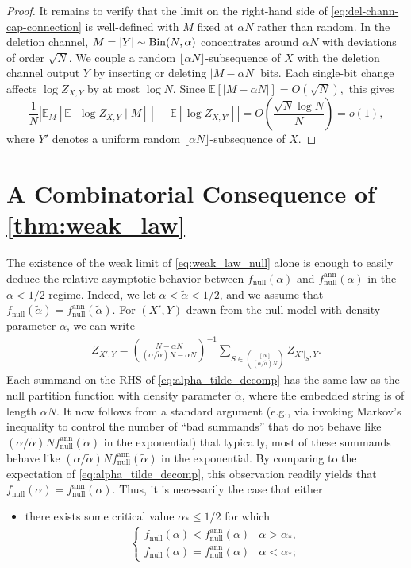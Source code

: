 \documentclass[11pt]{amsart}
\numberwithin{equation}{section}
\numberwithin{equation}{section}
\newcommand{\1}{\mathbbm{1}}
\newcommand{\E}{\mathbb{E}}
\newcommand{\Bin}{\textup{Bin}}
\newcommand{\fnull}{f_{\mathrm{null}}}
\newcommand{\fnullann}{f_{\mathrm{null}}^{\mathrm{ann}}}
\theoremstyle{definition}
\begin{document}
\begin{appendices}
\begin{proof}
It remains to verify that the limit on the right-hand side of \eqref{eq:del-chann-cap-connection} is well-defined with $M$ fixed at $\alpha N$ rather than random. In the deletion channel, $M = |Y| \sim \Bin(N,\alpha)$ concentrates around $\alpha N$ with deviations of order $\sqrt{N}.$ We couple a random $\lfloor\alpha N\rfloor$-subsequence of $X$ with the deletion channel output $Y$ by inserting or deleting $|M - \alpha N|$ bits. Each single-bit change affects $\log Z_{X,Y}$ by at most $\log N$. Since $\E[|M - \alpha N|] = O(\sqrt{N}),$ this gives
\[
\frac{1}{N}\left|\E_M\left[\E[\log Z_{X,Y} \mid M]\right] - \E[\log Z_{X, Y'}]\right| = O\!\left(\frac{\sqrt{N}\log N}{N}\right) = o(1),
\]
where $Y'$ denotes a uniform random $\lfloor\alpha N\rfloor$-subsequence of $X.$
\end{proof}

\section{\texorpdfstring{A Combinatorial Consequence of \cref{thm:weak_law}}{Addendum to Section \ref{subsec:defns_and_notation}}} \label{app:no-double-phase-transition}

The existence of the weak limit of \eqref{eq:weak_law_null} alone is enough to easily deduce the relative asymptotic behavior between $\fnull(\alpha)$ and $\fnullann(\alpha)$ in the $\alpha < 1/2$ regime. Indeed, we let $\alpha < \tilde\alpha < 1/2$, and we assume that $\fnull(\tilde\alpha) = \fnullann(\tilde\alpha)$. For $(X',Y)$ drawn from the null model with density parameter $\alpha$, we can write
\begin{align} \label{eq:alpha_tilde_decomp}
    Z_{X',Y} = \binom{N - \alpha N}{(\alpha/\tilde\alpha) N - \alpha N}^{-1} \sum_{S \in \binom{[N]}{(\alpha/\tilde\alpha) N}} Z_{X'|_S, Y}.
\end{align}
Each summand on the RHS of \eqref{eq:alpha_tilde_decomp} has the same law as the null partition function with density parameter $\tilde\alpha$, where the embedded string is of length $\alpha N$. It now follows from a standard argument (e.g., via invoking Markov's inequality to control the number of ``bad summands'' that do not behave like $(\alpha / \tilde\alpha) N \fnullann(\tilde\alpha)$ in the exponential) that typically, most of these summands behave like $(\alpha / \tilde\alpha) N \fnullann(\tilde\alpha)$ in the exponential. By comparing to the expectation of \eqref{eq:alpha_tilde_decomp}, this observation readily yields that $\fnull(\alpha) = \fnullann(\alpha)$. Thus, it is necessarily the case that either
\begin{itemize}
    \item there exists some critical value $\alpha_* \leq 1/2$ for which 
    \begin{align*}
        \begin{cases}
            \fnull(\alpha) < \fnullann(\alpha) & \alpha > \alpha_*, \\
            \fnull(\alpha) = \fnullann(\alpha) & \alpha < \alpha_*;
        \end{cases}
    \end{align*}


\end{itemize}
\end{appendices}
\end{document}
